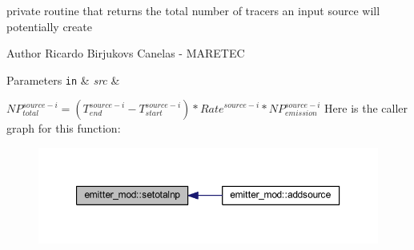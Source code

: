 private routine that returns the total number of tracers an input source will potentially create 

\begin{DoxyAuthor}{Author}
Ricardo Birjukovs Canelas -\/ M\+A\+R\+E\+T\+EC 
\end{DoxyAuthor}

\begin{DoxyParams}[1]{Parameters}
\mbox{\tt in}  & {\em src} & \\
\hline
\end{DoxyParams}
${NP}_{total}^{source-i}=(T_{end}^{source-i}-T_{start}^{source-i})*{Rate}^{source-i}*{NP}_{emission}^{source-i}$ Here is the caller graph for this function\+:\nopagebreak
\begin{figure}[H]
\begin{center}
\leavevmode
\includegraphics[width=350pt]{namespaceemitter__mod_a5c219dd6692a761ad4bf968ae750fcc6_icgraph}
\end{center}
\end{figure}
